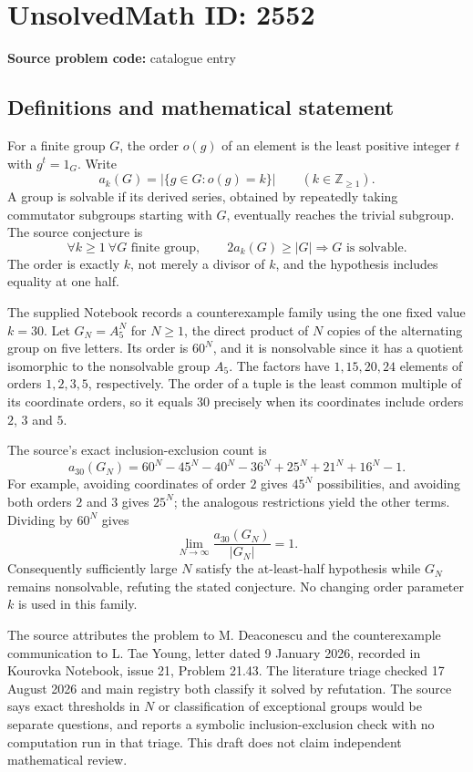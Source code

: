 \documentclass[11pt]{article}
\newcommand{\Z}{\mathbb{Z}}
\begin{document}
\section*{UnsolvedMath ID: 2552}
\textbf{Source problem code:} catalogue entry
\subsection{Definitions and mathematical statement}
For a finite group $G$, the order $o(g)$ of an element is the least positive integer $t$ with $g^t=1_G$. Write
\[
 a_k(G)=|\{g\in G:o(g)=k\}|\qquad(k\in\Z_{\ge1}).
\]
A group is solvable if its derived series, obtained by repeatedly taking commutator subgroups starting with $G$, eventually reaches the trivial subgroup. The source conjecture is
\[
 \forall k\ge1\ \forall G\text{ finite group},\qquad
 2a_k(G)\ge|G|\Longrightarrow G\text{ is solvable}.
\]
The order is exactly $k$, not merely a divisor of $k$, and the hypothesis includes equality at one half.

The supplied Notebook records a counterexample family using the one fixed value $k=30$. Let $G_N=A_5^N$ for $N\ge1$, the direct product of $N$ copies of the alternating group on five letters. Its order is $60^N$, and it is nonsolvable since it has a quotient isomorphic to the nonsolvable group $A_5$. The factors have $1,15,20,24$ elements of orders $1,2,3,5$, respectively. The order of a tuple is the least common multiple of its coordinate orders, so it equals $30$ precisely when its coordinates include orders $2$, $3$ and $5$.

The source's exact inclusion-exclusion count is
\[
 a_{30}(G_N)=60^N-45^N-40^N-36^N
                   +25^N+21^N+16^N-1.
\]
For example, avoiding coordinates of order $2$ gives $45^N$ possibilities, and avoiding both orders $2$ and $3$ gives $25^N$; the analogous restrictions yield the other terms. Dividing by $60^N$ gives
\[
 \lim_{N\to\infty}\frac{a_{30}(G_N)}{|G_N|}=1.
\]
Consequently sufficiently large $N$ satisfy the at-least-half hypothesis while $G_N$ remains nonsolvable, refuting the stated conjecture. No changing order parameter $k$ is used in this family.

The source attributes the problem to M. Deaconescu and the counterexample communication to L. Tae Young, letter dated 9 January 2026, recorded in Kourovka Notebook, issue 21, Problem 21.43. The literature triage checked 17 August 2026 and main registry both classify it solved by refutation. The source says exact thresholds in $N$ or classification of exceptional groups would be separate questions, and reports a symbolic inclusion-exclusion check with no computation run in that triage. This draft does not claim independent mathematical review.
\end{document}

